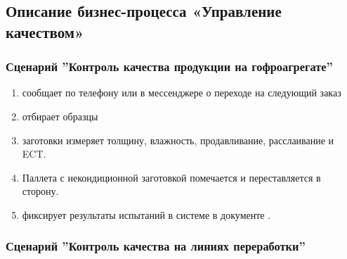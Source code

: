 

\subsection{Описание бизнес-процесса «Управление качеством»}
\label{bp:quality}

\subsubsection{Сценарий ''Контроль качества продукции на гофроагрегате''}
\label{bp:quality_1}

\begin{enumerate}



 \item \gaoperator сообщает \laborant по телефону или в мессенджере о переходе на следующий заказ
 \item \laborant отбирает образцы
 \item \laborant заготовки измеряет толщину, влажность, продавливание, расслаивание и ECT.

\item Паллета  с некондиционной заготовкой помечается и переставляется в сторону.
\item \laborant  фиксирует результаты испытаний в системе \gofro  в документе .

\end{enumerate}


\subsubsection{Сценарий ''Контроль качества на линиях переработки''}
\label{bp:quality_2}

